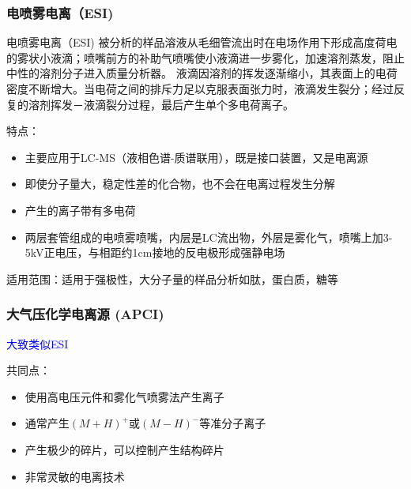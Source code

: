 \subsubsection*{ 电喷雾电离（ESI)}
    \begin{definition*}{电喷雾电离（ESI)}
        被分析的样品溶液从毛细管流出时在电场作用下形成高度荷电的雾状小液滴；喷嘴前方的补助气喷嘴使小液滴进一步雾化，加速溶剂蒸发，阻止中性的溶剂分子进入质量分析器。
    液滴因溶剂的挥发逐渐缩小，其表面上的电荷密度不断增大。当电荷之间的排斥力足以克服表面张力时，液滴发生裂分；经过反复的溶剂挥发－液滴裂分过程，最后产生单个多电荷离子。
    \end{definition*}
    特点：
    \begin{itemize}
        \item 主要应用于LC-MS（液相色谱-质谱联用），既是接口装置，又是电离源
        \item 即使分子量大，稳定性差的化合物，也不会在电离过程发生分解
        \item 产生的离子带有多电荷
        \item 两层套管组成的电喷雾喷嘴，内层是LC流出物，外层是雾化气，喷嘴上加3-5kV正电压，与相距约1cm接地的反电极形成强静电场
    \end{itemize}

    适用范围：适用于强极性，大分子量的样品分析如肽，蛋白质，糖等

\subsubsection*{大气压化学电离源 (APCI)} 
    
    \textcolor{blue}{大致类似ESI}

    共同点：
    \begin{itemize}
        \item 使用高电压元件和雾化气喷雾法产生离子
        \item 通常产生$(M+H)^{+}$或$(M-H)^{-}$等准分子离子
        \item 产生极少的碎片，可以控制产生结构碎片
        \item 非常灵敏的电离技术
    \end{itemize}

